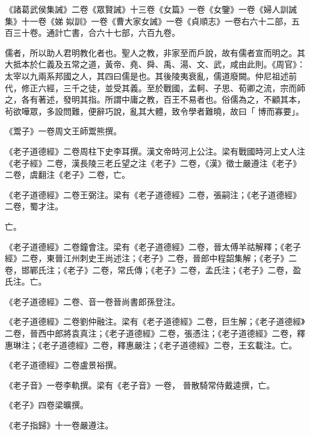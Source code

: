 \begin{pinyinscope}
 《諸葛武侯集誡》二卷《眾賢誡》十三卷《女篇》一卷《女鑒》一卷《婦人訓誡集》十一卷《娣
 姒訓》一卷《曹大家女誡》一卷《貞順志》一卷右六十二部，五百三十卷。通計亡書，合六十七部，六百九卷。



 儒者，所以助人君明教化者也。聖人之教，非家至而戶說，故有儒者宣而明之。其大抵本於仁義及五常之道，黃帝、堯、舜、禹、湯、文、武，咸由此則。《周官》：太宰以九兩系邦國之人，其四曰儒是也。其後陵夷衰亂，儒道廢闕。仲尼祖述前代，修正六經，三千之徒，並受其義。至於戰國，孟軻、子思、荀卿之流，宗而師之，各有著述，發明其指。所謂中庸之教，百王不易者也。俗儒為之，不顧其本，茍欲嘩眾，多設問難，便辭巧說，亂其大體，致令學者難曉，故曰「
 博而寡要」。



 《鬻子》一卷周文王師鬻熊撰。



 《老子道德經》二卷周柱下史李耳撰。漢文帝時河上公注。梁有戰國時河上丈人注《老子經》二卷，漢長陵三老丘望之注《老子》二卷，《漢》徵士嚴遵注《老子》二卷，虞翻注《老子》二卷，亡。



 《老子道德經》二卷王弼注。梁有《老子道德經》二卷，張嗣注；《老子道德經》二卷，蜀才注。



 亡。



 《老子道德經》二卷鐘會注。梁有《老子道德經》二卷，晉太傅羊祜解釋；《老子經》二卷，東晉江州刺史王尚述注；《老子》二卷，晉郎中程韶集解；《老子》二卷，邯鄲氏注；《老子》二卷，常氏傳；《老子》二卷，孟氏注；《老子》二卷，盈氏注。亡。



 《老子道德經》二卷、音一卷晉尚書郎孫登注。



 《老子道德經》二卷劉仲融注。梁有《老子道德經》二卷，巨生解；《老子道德經》二卷，晉西中郎將袁真注；《老子道德經》二卷，張憑注；《老子道德經》二卷，釋惠琳注；《老子道德經》二卷，釋惠嚴注；《老子道德經》二卷，王玄載注。亡。



 《老子道德經》二卷盧景裕撰。



 《老子音》一卷李軌撰。梁有《老子音》一卷，
 晉散騎常侍戴逵撰，亡。



 《老子》四卷梁曠撰。



 《老子指歸》十一卷嚴遵注。




\end{pinyinscope}
